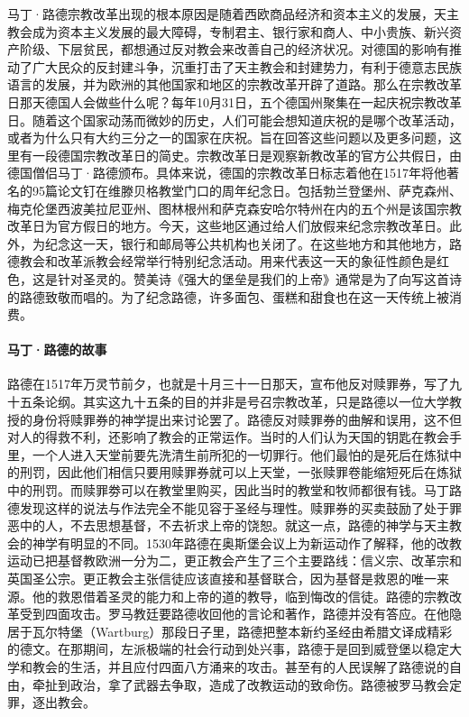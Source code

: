 马丁·路德宗教改革出现的根本原因是随着西欧商品经济和资本主义的发展，天主教会成为资本主义发展的最大障碍，专制君主、银行家和商人、中小贵族、新兴资产阶级、下层贫民，都想通过反对教会来改善自己的经济状况。对德国的影响有推动了广大民众的反封建斗争，沉重打击了天主教会和封建势力，有利于德意志民族语言的发展，并为欧洲的其他国家和地区的宗教改革开辟了道路。那么在宗教改革日那天德国人会做些什么呢？每年10月31日，五个德国州聚集在一起庆祝宗教改革日。随着这个国家动荡而微妙的历史，人们可能会想知道庆祝的是哪个改革活动，或者为什么只有大约三分之一的国家在庆祝。旨在回答这些问题以及更多问题，这里有一段德国宗教改革日的简史。宗教改革日是观察新教改革的官方公共假日，由德国僧侣马丁·路德颁布。具体来说，德国的宗教改革日标志着他在1517年将他著名的95篇论文钉在维滕贝格教堂门口的周年纪念日。包括勃兰登堡州、萨克森州、梅克伦堡西波美拉尼亚州、图林根州和萨克森安哈尔特州在内的五个州是该国宗教改革日为官方假日的地方。今天，这些地区通过给人们放假来纪念宗教改革日。此外，为纪念这一天，银行和邮局等公共机构也关闭了。在这些地方和其他地方，路德教会和改革派教会经常举行特别纪念活动。用来代表这一天的象征性颜色是红色，这是针对圣灵的。赞美诗《强大的堡垒是我们的上帝》通常是为了向写这首诗的路德致敬而唱的。为了纪念路德，许多面包、蛋糕和甜食也在这一天传统上被消费。

\paragraph{马丁·路德的故事}
路德在1517年万灵节前夕，也就是十月三十一日那天，宣布他反对赎罪券，写了九十五条论纲。其实这九十五条的目的并非是号召宗教改革，只是路德以一位大学教授的身份将赎罪券的神学提出来讨论罢了。路德反对赎罪券的曲解和误用，这不但对人的得救不利，还影响了教会的正常运作。当时的人们认为天国的钥匙在教会手里，一个人进入天堂前要先洗清生前所犯的一切罪行。他们最怕的是死后在炼狱中的刑罚，因此他们相信只要用赎罪券就可以上天堂，一张赎罪卷能缩短死后在炼狱中的刑罚。而赎罪劵可以在教堂里购买，因此当时的教堂和牧师都很有钱。马丁路德发现这样的说法与作法完全不能见容于圣经与理性。赎罪券的买卖鼓励了处于罪恶中的人，不去思想基督，不去祈求上帝的饶恕。就这一点，路德的神学与天主教会的神学有明显的不同。1530年路德在奥斯堡会议上为新运动作了解释，他的改教运动已把基督教欧洲一分为二，更正教会产生了三个主要路线：信义宗、改革宗和英国圣公宗。更正教会主张信徒应该直接和基督联合，因为基督是救恩的唯一来源。他的救恩借着圣灵的能力和上帝的道的教导，临到悔改的信徒。路德的宗教改革受到四面攻击。罗马教廷要路德收回他的言论和著作，路德并没有答应。在他隐居于瓦尔特堡（Wartburg）那段日子里，路德把整本新约圣经由希腊文译成精彩的德文。在那期间，左派极端的社会行动到处兴事，路德于是回到威登堡以稳定大学和教会的生活，并且应付四面八方涌来的攻击。甚至有的人民误解了路德说的自由，牵扯到政治，拿了武器去争取，造成了改教运动的致命伤。路德被罗马教会定罪，逐出教会。

